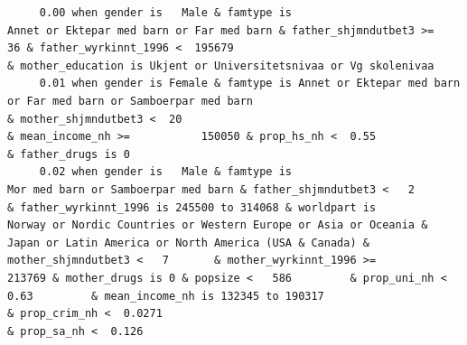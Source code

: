 \documentclass[
  letterpaper,
  DIV=11,
  numbers=noendperiod]{scrreprt}
\begin{document}
\begin{verbatim}
     0.00 when gender is   Male & famtype is                        Annet or Ektepar med barn or Far med barn & father_shjmndutbet3 >=       36 & father_wyrkinnt_1996 <  195679                                                                                                                                                                                                                                                                                                                                                                                                                                                                & mother_education is Ukjent or Universitetsnivaa or Vg skolenivaa                                                                                                                                                                     
     0.01 when gender is Female & famtype is Annet or Ektepar med barn or Far med barn or Samboerpar med barn                                                                                                                                                                                                                                 & mother_shjmndutbet3 <  20                                                                                                                              & mean_income_nh >=           150050 & prop_hs_nh <  0.55                                                                                                                                                                                                         & father_drugs is 0                                                                                           
     0.02 when gender is   Male & famtype is                              Mor med barn or Samboerpar med barn & father_shjmndutbet3 <   2       & father_wyrkinnt_1996 is 245500 to 314068 & worldpart is            Norway or Nordic Countries or Western Europe or Asia or Oceania & Japan or Latin America or North America (USA & Canada) & mother_shjmndutbet3 <   7       & mother_wyrkinnt_1996 >=           213769 & mother_drugs is 0 & popsize <   586         & prop_uni_nh <  0.63         & mean_income_nh is 132345 to 190317                              & prop_crim_nh <  0.0271                                                                                                                  & prop_sa_nh <  0.126                                                                                                                                               

\end{verbatim}
\end{document}
